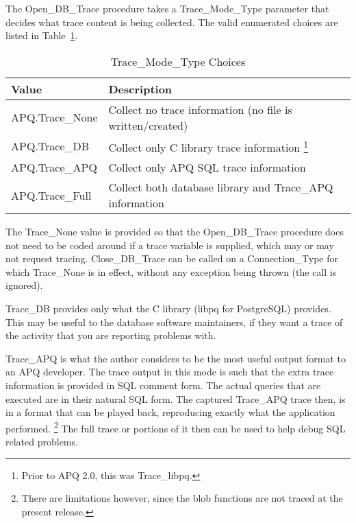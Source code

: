 \documentclass[english,letterpaper]{book}
\begin{document}
The Open\_DB\_Trace procedure takes a Trace\_Mode\_Type parameter
that decides what trace content is being collected. The valid enumerated
choices are listed in Table~\ref{t:tmchoic}.

\begin{table}
   \begin{center}
      \begin{tabular}{ll}
         Value           & Description\\
         \hline
         APQ.Trace\_None & Collect no trace information (no file is written/created)\\
         APQ.Trace\_DB   & Collect only C library trace information%
            \footnote{Prior to APQ 2.0, this was Trace\_libpq.}\\
         APQ.Trace\_APQ  & Collect only APQ SQL trace information\\
         APQ.Trace\_Full & Collect both database library and Trace\_APQ information\\
      \end{tabular}
   \end{center}
   \caption{Trace\_Mode\_Type Choices}\label{t:tmchoic}
\end{table}

The Trace\_None value is provided so that the Open\_DB\_Trace procedure
does not need to be coded around if a trace variable is supplied,
which may or may not request tracing. Close\_DB\_Trace can be called
on a Connection\_Type for which Trace\_None is in effect, without
any exception being thrown (the call is ignored).

Trace\_DB provides only what the C library (libpq for PostgreSQL)
provides. This may be useful to the database software maintainers,
if they want a trace of the activity that you are reporting problems
with.

Trace\_APQ is what the author considers to be the most useful output
format to an APQ developer. The trace output in this mode is such
that the extra trace information is provided in SQL comment form.
The actual queries that are executed are in their natural SQL form.
The captured Trace\_APQ trace then, is in a format that can be played
back, reproducing exactly what the application performed.%
\footnote{There are limitations however, since the blob functions are not traced
at the present release.%
} The full trace or portions of it then can be used to help debug SQL
related problems. 
\end{document}
